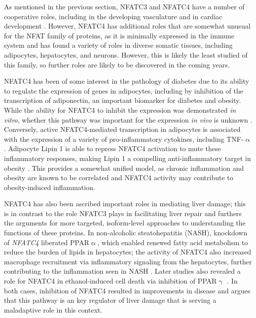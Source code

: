 As mentioned in the previous section, NFATC3 and NFATC4 have a number of cooperative roles, including in the developing vasculature and in cardiac development \citep{Graef2001, Bushdid2003}. However, NFATC4 has additional roles that are somewhat unusual for the NFAT family of proteins, as it is minimally expressed in the immune system and has found a variety of roles in diverse somatic tissues, including adipocytes, hepatocytes, and neurons. However, this is likely the least studied of this family, so further roles are likely to be discovered in the coming years.

NFATC4 has been of some interest in the pathology of diabetes due to its ability to regulate the expression of genes in adipocytes, including by inhibition of the transcription of adiponectin, an important biomarker for diabetes and obesity. While the ability for NFATC4 to inhibit the expression was demonstrated \textit{in vitro}, whether this pathway was important for the expression \textit{in vivo} is unknown \citep{Kim2006}. Conversely, active NFATC4\hyp{}mediated transcription in adipocytes is associated with the expression of a variety of pro\hyp{}inflammatory cytokines, including TNF\hyp{}$\upalpha$ \citep{Kim2008}. Adipocyte Lipin 1 is able to repress NFATC4 activation to mute these inflammatory responses, making Lipin 1 a compelling anti-inflammatory target in obesity \citep{Kim2010}. This provides a somewhat unified model, as chronic inflammation and obesity are known to be correlated and NFATC4 activity may contribute to obesity-induced inflammation. 

NFATC4 has also been ascribed important roles in mediating liver damage; this is in contrast to the role NFATC3 plays in facilitating liver repair and furthers the arguments for more targeted, isoform\hyp{}level approaches to understanding the functions of these proteins. In non\hyp{}alcoholic steatohepatitis (NASH), knockdown of \textit{NFATC4} liberated PPAR$\upalpha$, which enabled renewed fatty acid metabolism to reduce the burden of lipids in hepatocytes; the activity of NFATC4 also increased macrophage recruitment via inflammatory signaling from the hepatocytes, further contributing to the inflammation seen in NASH \citep{Du2020}. Later studies also revealed a role for NFATC4 in ethanol\hyp{}induced cell death via inhibition of PPAR$\upgamma$  \citep{Wu2021}. In both cases, inhibition of NFATC4 resulted in improvements in disease and argues that this pathway is an key regulator of liver damage that is serving a maladaptive role in this context.

